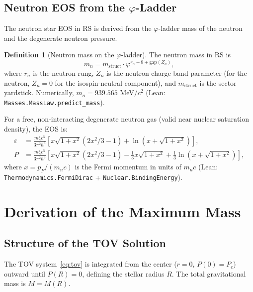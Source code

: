 \documentclass[12pt,a4paper]{article}
\theoremstyle{definition}
\newtheorem{definition}[theorem]{Definition}
\theoremstyle{remark}
\begin{document}
\subsection{Neutron EOS from the $\varphi$-Ladder}

The neutron star EOS in RS is derived from the $\varphi$-ladder mass
of the neutron and the degenerate neutron pressure.

\begin{definition}[Neutron mass on the $\varphi$-ladder]
The neutron mass in RS is
\begin{equation}
  m_n = m_\mathrm{struct} \cdot \varphi^{r_n - 8 + \mathrm{gap}(Z_n)},
\end{equation}
where $r_n$ is the neutron rung, $Z_n$ is the neutron charge-band
parameter (for the neutron, $Z_n = 0$ for the isospin-neutral component),
and $m_\mathrm{struct}$ is the sector yardstick.  Numerically,
$m_n = 939.565$ MeV/$c^2$ (Lean: \texttt{Masses.MassLaw.predict\_mass}).
\end{definition}

For a free, non-interacting degenerate neutron gas (valid near nuclear
saturation density), the EOS is:
\begin{align}
  \varepsilon &= \frac{m_n^4 c^5}{3\pi^2\hbar^3}
  \left[x\sqrt{1+x^2}(2x^2/3 - 1) + \ln(x + \sqrt{1+x^2})\right], \\
  P &= \frac{m_n^4 c^5}{3\pi^2\hbar^3}
  \left[x\sqrt{1+x^2}(2x^2/3 - 1) - \frac{1}{3}x\sqrt{1+x^2}
  + \tfrac{1}{3}\ln(x+\sqrt{1+x^2})\right],
  \label{eq:eos}
\end{align}
where $x = p_F/(m_n c)$ is the Fermi momentum in units of $m_n c$
(Lean: \texttt{Thermodynamics.FermiDirac} + \texttt{Nuclear.BindingEnergy}).

\section{Derivation of the Maximum Mass}
\label{sec:maxmass}

\subsection{Structure of the TOV Solution}

The TOV system~\eqref{eq:tov} is integrated from the center
($r = 0$, $P(0) = P_c$) outward until $P(R) = 0$, defining the
stellar radius $R$.  The total gravitational mass is $M = M(R)$.
\end{document}
